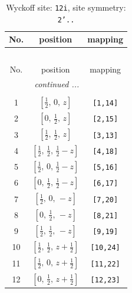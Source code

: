 \documentclass[fleqn,8pt]{jsarticle}
\begin{document}
\begin{longtable}{ccc}
\caption{Wyckoff site: {\tt 12i}, site symmetry: {\tt 2'..}}
 \\
 \hline \hline
No. & position & mapping \\ \hline \endfirsthead

\multicolumn{2}{l}{\tablename\ \thetable{}} \\
 \hline \hline
No. & position & mapping \\ \hline \endhead

 \hline \hline
\multicolumn{2}{r}{\footnotesize\it continued ...} \\ \endfoot

 \hline \hline
\multicolumn{2}{r}{} \\ \endlastfoot

1 & $\left[ \frac{1}{2},\, 0,\, z \right]$ & {\tt [1,14]} \\ \hline
2 & $\left[ 0,\, \frac{1}{2},\, z \right]$ & {\tt [2,15]} \\ \hline
3 & $\left[ \frac{1}{2},\, \frac{1}{2},\, z \right]$ & {\tt [3,13]} \\ \hline
4 & $\left[ \frac{1}{2},\, \frac{1}{2},\, \frac{1}{2} - z \right]$ & {\tt [4,18]} \\ \hline
5 & $\left[ \frac{1}{2},\, 0,\, \frac{1}{2} - z \right]$ & {\tt [5,16]} \\ \hline
6 & $\left[ 0,\, \frac{1}{2},\, \frac{1}{2} - z \right]$ & {\tt [6,17]} \\ \hline
7 & $\left[ \frac{1}{2},\, 0,\, - z \right]$ & {\tt [7,20]} \\ \hline
8 & $\left[ 0,\, \frac{1}{2},\, - z \right]$ & {\tt [8,21]} \\ \hline
9 & $\left[ \frac{1}{2},\, \frac{1}{2},\, - z \right]$ & {\tt [9,19]} \\ \hline
10 & $\left[ \frac{1}{2},\, \frac{1}{2},\, z + \frac{1}{2} \right]$ & {\tt [10,24]} \\ \hline
11 & $\left[ \frac{1}{2},\, 0,\, z + \frac{1}{2} \right]$ & {\tt [11,22]} \\ \hline
12 & $\left[ 0,\, \frac{1}{2},\, z + \frac{1}{2} \right]$ & {\tt [12,23]} \\
\end{longtable}
\renewcommand{\arraystretch}{1.2}
\end{document}
